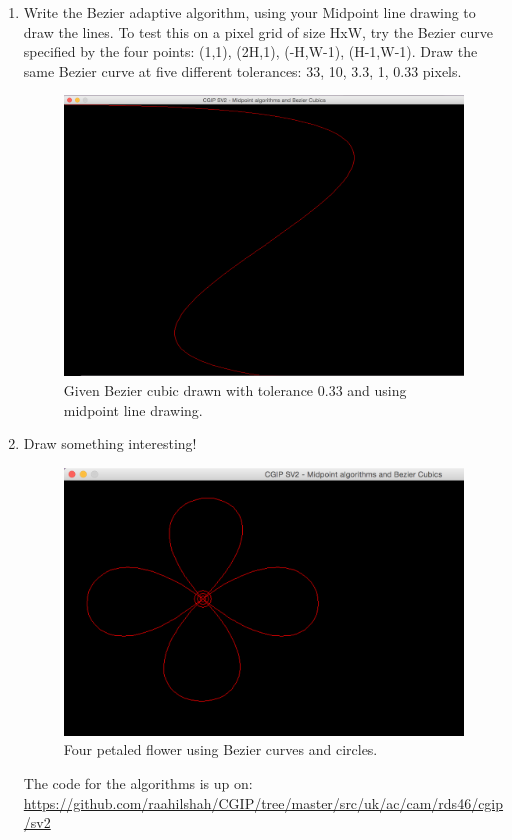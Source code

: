 \documentclass[11pt]{article}
\begin{document}
\begin{enumerate}
	\item 
	Write the Bezier adaptive algorithm, using your Midpoint line drawing to draw the lines. To test this on a pixel grid of size HxW, try the Bezier curve specified by the four points: (1,1), (2H,1), (-H,W-1), (H-1,W-1). Draw the same Bezier curve at five different tolerances: 33, 10, 3.3, 1, 0.33 pixels.
	\begin{figure}[!htbp]
		\begin{center}
			\includegraphics[scale=0.4]{bezier}
		\end{center}
		\caption{Given Bezier cubic drawn with tolerance 0.33 and using midpoint line drawing.}
	\end{figure}
	\item Draw something interesting!
	\pagebreak
	\begin{figure}[!htbp]
		\begin{center}
			\includegraphics[scale=0.6]{flower}
		\end{center}
		\caption{Four petaled flower using Bezier curves and circles.}
	\end{figure}

	The code for the algorithms is up on: 
	\url{https://github.com/raahilshah/CGIP/tree/master/src/uk/ac/cam/rds46/cgip/sv2}
\end{enumerate}
\end{document}
